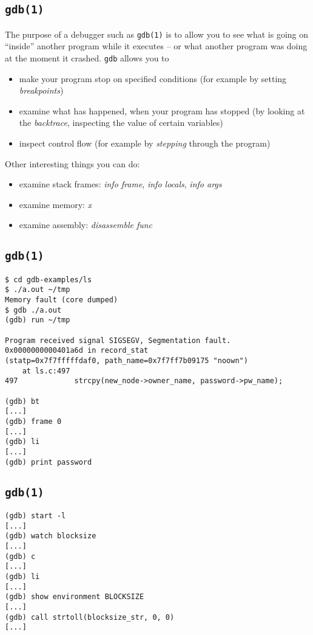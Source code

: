\documentclass[xga]{xdvislides}
\begin{document}
\subsection{{\tt gdb(1)}}

The purpose of a debugger such as {\tt gdb(1)} is to allow you to see what is
going on ``inside'' another program while it executes -- or what another
program was doing at the moment it crashed. {\tt gdb} allows you to

\begin{itemize}
	\item make your program stop on specified conditions (for example by
		setting {\em breakpoints})
	\item examine what has happened, when your program has stopped (by looking
		at the {\em backtrace}, inspecting the value of certain variables)
	\item inspect control flow (for example by {\em stepping} through the
		program)
\end{itemize}
\vspace{.25in}
Other interesting things you can do:

\begin{itemize}
	\item examine stack frames: {\em info frame}, {\em info locals}, {\em info
		args}
	\item examine memory: {\em x}
	\item examine assembly: {\em disassemble func}
\end{itemize}


\subsection{{\tt gdb(1)}}
\begin{verbatim}
$ cd gdb-examples/ls
$ ./a.out ~/tmp
Memory fault (core dumped)
$ gdb ./a.out
(gdb) run ~/tmp

Program received signal SIGSEGV, Segmentation fault.
0x0000000000401a6d in record_stat
(statp=0x7f7fffffdaf0, path_name=0x7f7ff7b09175 "noown")
    at ls.c:497
497             strcpy(new_node->owner_name, password->pw_name);

(gdb) bt
[...]
(gdb) frame 0
[...]
(gdb) li
[...]
(gdb) print password
\end{verbatim}

\subsection{{\tt gdb(1)}}
\begin{verbatim}
(gdb) start -l
[...]
(gdb) watch blocksize
[...]
(gdb) c
[...]
(gdb) li
[...]
(gdb) show environment BLOCKSIZE
[...]
(gdb) call strtoll(blocksize_str, 0, 0)
[...]
\end{verbatim}
\end{document}
